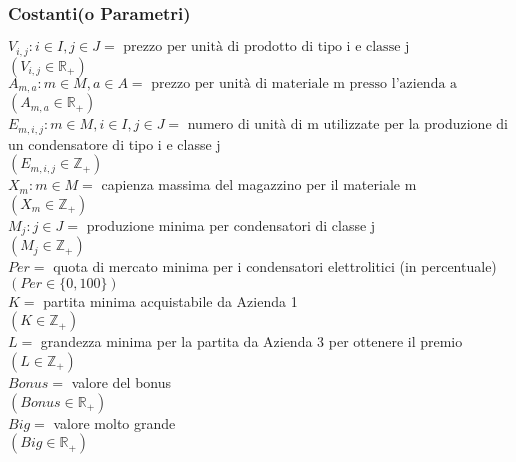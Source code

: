 \documentclass[11pt,a4paper]{article}
\begin{document}
\subsubsection{Costanti(o Parametri)}
$V_{i,j}:i \in I, j \in J =\text{ prezzo per unità di prodotto di tipo i e classe j}$ \\
$(V_{i,j} \in \mathbb{R}_+)$ \\
$A_{m,a}:m \in M, a \in A =\text{ prezzo per unità di materiale m presso l'azienda a}$ \\
$(A_{m,a} \in \mathbb{R}_+)$ \\
$E_{m,i,j}:m \in M, i \in I, j \in J =$ numero di unità di m utilizzate per la produzione di un condensatore di tipo i e classe j\\
$(E_{m,i,j} \in \mathbb{Z}_+)$ \\
$X_{m}: m \in M =$ capienza massima del magazzino per il materiale m \\
$(X_{m} \in \mathbb{Z}_+)$ \\
$M_{j}: j \in J =$ produzione minima per condensatori di classe j \\
$(M_{j} \in \mathbb{Z}_+)$ \\
$Per =$ quota di mercato minima per i condensatori elettrolitici (in percentuale) \\
$(Per \in \{0,100\} )$ \\
$K =$ partita minima acquistabile da Azienda 1 \\
$(K \in \mathbb{Z}_+)$ \\
$L =$ grandezza minima per la partita da Azienda 3 per ottenere il premio \\
$(L \in \mathbb{Z}_+)$ \\
$Bonus =$ valore del bonus \\
$(Bonus \in \mathbb{R}_+)$ \\
$Big =$ valore molto grande \\
$(Big \in \mathbb{R}_+)$
\end{document}
